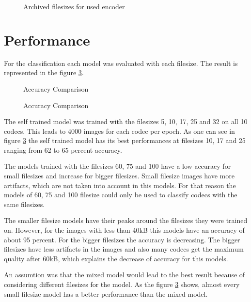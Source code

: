 \begin{figure}[h!]
	\centering
	\resizebox{\textwidth}{!}{}
    \caption{Archived filesizes for used encoder}
	\label{fig: no_transfer}
\end{figure}

\section{Performance}
For the classification each model was evaluated with each filesize. The result is represented in the figure \ref{fig: acc_comparison}.

\begin{figure}[h!]
	\centering
	\resizebox{\textwidth}{!}{}
	\caption{Accuracy Comparison}
	\label{fig: acc_comparison}
\end{figure}

\begin{figure}[h!]
	\centering
	\resizebox{\textwidth}{!}{}
	\caption{Accuracy Comparison}
	\label{fig: acc_comparison}
\end{figure}

\noindent
The self trained model was trained with the filesizes 5, 10, 17, 25 and 32 on all 10 codecs. This leads to 4000 images for each codec per epoch. As one can see in figure \ref{fig: acc_comparison} the self trained model has its best performances at filesizes 10, 17 and 25 ranging from 62 to 65 percent accuracy.

\noindent
The models trained with the filesizes 60, 75 and 100 have a low accuracy for small filesizes and increase for bigger filesizes. Small filesize images have more artifacts, which are not taken into account in this models. For that reason the models of 60, 75 and 100 filesize could only be used to classify codecs with the same filesizes.

\noindent
The smaller filesize models have their peaks around the filesizes they were trained on. However, for the images with less than 40kB this models have an accuracy of about 95 percent. For the bigger filesizes the accuracy is decreasing. The bigger filesizes have less artifacts in the images and also many codecs get the maximum quality after 60kB, which explains the decrease of accuracy for this models.

\noindent
An assumtion was that the mixed model would lead to the best result because of considering different filesizes for the model. As the figure \ref{fig: acc_comparison} shows, almost every small filesize model has a better performance than the mixed model.

